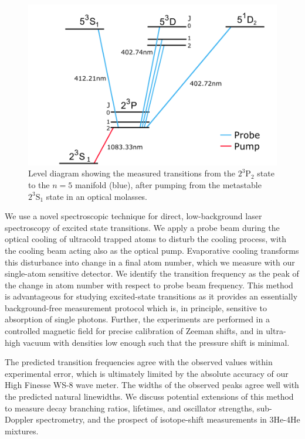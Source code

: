 \begin{figure}
    \begin{center}
        \includegraphics[width=\textwidth]{lvl_diag.png}    
    \end{center}
    \caption{Level diagram showing the measured transitions from the $2^3\mathrm{P}_2$ state to the $n=5$ manifold (blue), after pumping from the metastable $2^3\mathrm{S}_1$ state in an optical molasses.\\
    }
    \label{fig:my_label}
\end{figure}

We use a novel spectroscopic technique for direct, low-background laser spectroscopy of excited state transitions. We apply a probe beam during the optical cooling of ultracold trapped atoms to disturb the cooling process, with the cooling beam acting also as the optical pump. Evaporative cooling transforms this disturbance into change in a final atom number, which we measure with our single-atom sensitive detector. We identify the transition frequency as the peak of the change in atom number with respect to probe beam frequency. This method is advantageous for studying excited-state transitions as it provides an essentially background-free measurement protocol which is, in principle, sensitive to absorption of single photons. Further, the experiments are performed in a controlled magnetic field for precise calibration of Zeeman shifts, and in ultra-high vacuum with densities low enough such that the pressure shift is minimal. 

The predicted transition frequencies\cite{Pachucki2017} agree with the observed values within experimental error, which is ultimately limited by the absolute accuracy of our High Finesse WS-8 wave meter. The widths of the observed peaks agree well with the predicted natural linewidths.  We discuss potential extensions of this method to measure decay branching ratios, lifetimes, and oscillator strengths, sub-Doppler spectrometry, and the prospect of isotope-shift measurements in 3He-4He mixtures.

